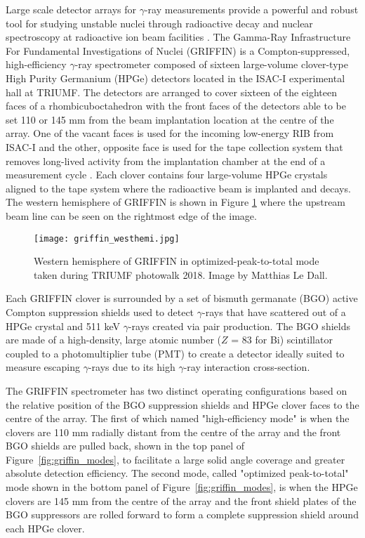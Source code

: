 \documentclass[cnatzke_thesis_proposal.tex]{subfiles}
\begin{document}
Large scale detector arrays for $\gamma$-ray measurements provide a powerful and robust tool for studying unstable nuclei through radioactive decay and nuclear spectroscopy at radioactive ion beam facilities \cite{garnsworthy_griffin_2019}. 
The Gamma-Ray Infrastructure For Fundamental Investigations of Nuclei (GRIFFIN) is a Compton-suppressed, high-efficiency $\gamma$-ray spectrometer composed of sixteen large-volume clover-type High Purity Germanium (HPGe) detectors located in the ISAC-I experimental hall at TRIUMF. 
The detectors are arranged to cover sixteen of the eighteen faces of a rhombicuboctahedron with the front faces of the detectors able to be set 110 or 145 mm from the beam implantation location at the centre of the array. 
One of the vacant faces is used for the incoming low-energy RIB from ISAC-I and the other, opposite face is used for the tape collection system that removes long-lived activity from the implantation chamber at the end of a measurement cycle \cite{garnsworthy_griffin_2019}. Each clover contains four large-volume HPGe crystals aligned to the tape system where the radioactive beam is implanted and decays. 
The western hemisphere of GRIFFIN is shown in Figure \ref{fig:griffin_westhemi} where the upstream beam line can be seen on the rightmost edge of the image. 

\begin{center}
  \begin{figure}[H]
    \begin{center}
      \texttt{[image: griffin\_westhemi.jpg]}
    \end{center}
    \caption{Western hemisphere of GRIFFIN in optimized-peak-to-total mode taken during TRIUMF photowalk 2018. Image by Matthias Le Dall.}
    \label{fig:griffin_westhemi}
  \end{figure}
\end{center}

Each GRIFFIN clover is surrounded by a set of bismuth germanate (BGO) active Compton suppression shields used to detect $\gamma$-rays that have scattered out of a HPGe crystal and 511 keV $\gamma$-rays created via pair production. 
The BGO shields are made of a high-density, large atomic number ($Z$ = 83 for Bi) scintillator coupled to a photomultiplier tube (PMT) to create a detector ideally suited to measure escaping $\gamma$-rays due to its high $\gamma$-ray interaction cross-section. 

The GRIFFIN spectrometer has two distinct operating configurations based on the relative position of the BGO suppression shields and HPGe clover faces to the centre of the array. 
The first of which named "high-efficiency mode" is when the clovers are 110 mm radially distant from the centre of the array and the front BGO shields are pulled back, shown in the top panel of Figure~\ref{fig:griffin_modes}, to facilitate a large solid angle coverage and greater absolute detection efficiency. 
The second mode, called "optimized peak-to-total" mode shown in the bottom panel of Figure~\ref{fig:griffin_modes}, is when the HPGe clovers are 145 mm from the centre of the array and the front shield plates of the BGO suppressors are rolled forward to form a complete suppression shield around each HPGe clover. 
\end{document}
